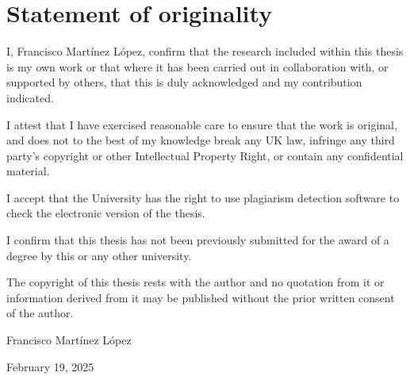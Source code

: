 \chapter*{Statement of originality}
\label{C:Statement}

I, Francisco Mart\'{i}nez L\'{o}pez, confirm that the research included
within this thesis is my own work or that where it has been carried out in collaboration with, or supported by others, that this is duly acknowledged and my contribution indicated.

\bigskip

\noindent
I attest that I have exercised reasonable care to ensure that the work is
original, and does not to the best of my knowledge break any UK law, infringe any third party's copyright or other Intellectual Property Right, or contain any confidential material.

\bigskip

\noindent
I accept that the University has the right to use plagiarism detection software to check the electronic version of the thesis.

\bigskip

\noindent
I confirm that this thesis has not been previously submitted for the award of a degree by this or any other university.

\bigskip

\noindent
The copyright of this thesis rests with the author and no quotation from it or information derived from it may be published without the prior written consent of the author.

\bigskip

\noindent
Francisco Mart\'{i}nez L\'{o}pez

\noindent
February 19, 2025

\bigskip